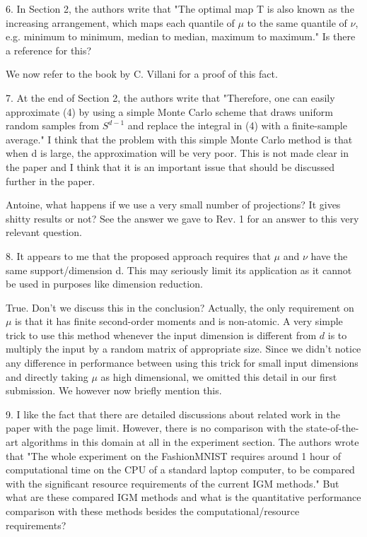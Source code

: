 \documentclass{article}
\newcommand{\rev}[1]{{\color{red} #1}}
\newcommand{\umut}[1]{{\color{blue} #1}}
\newcommand{\antoine}[1]{{\color{orange} #1}}
\begin{document}
\rev{6. In Section 2, the authors write that "The optimal map T is also known as the increasing arrangement, which maps each quantile of $\mu$ to the same quantile of $\nu$, e.g. minimum to minimum, median to median, maximum to maximum." Is there a reference for this?}

\antoine{We now refer to the book by C. Villani for a proof of this fact.}

\rev{7. At the end of Section 2, the authors write that "Therefore, one can easily approximate (4) by using a simple Monte Carlo scheme that draws uniform random samples from $S^{d-1}$ and replace the integral in (4) with a finite-sample average." I think that the problem with this simple Monte Carlo method is that when d is large, the approximation will be very poor. This is not made clear in the paper and I think that it is an important issue that should be discussed further in the paper.}

\umut{Antoine, what happens if we use a very small number of projections? It gives shitty results or not?}
\antoine{See the answer we gave to Rev. 1 for an answer to this very relevant question.}

\rev{8. It appears to me that the proposed approach requires that $\mu$ and $\nu$ have the same support/dimension d. This may seriously limit its application as it cannot be used in purposes like dimension reduction.}

\umut{True. Don't we discuss this in the conclusion?}
\antoine{Actually, the only requirement on $\mu$ is that it has finite second-order moments and is non-atomic. A very simple trick to use this method whenever the input dimension is different from $d$ is to multiply the input by a random matrix of appropriate size. Since we didn't notice any difference in performance between using this trick for small input dimensions and directly taking $\mu$ as high dimensional, we omitted this detail in our first submission. We however now briefly mention this.}

\rev{9. I like the fact that there are detailed discussions about related work in the paper with the page limit. However, there is no comparison with the state-of-the-art algorithms in this domain at all in the experiment section. The authors wrote that "The whole experiment on the FashionMNIST requires around 1 hour of computational time on the CPU of a standard laptop computer, to be compared with the significant resource requirements of the current IGM methods." But what are these compared IGM methods and what is the quantitative performance comparison with these methods besides the computational/resource requirements?}
\end{document}
